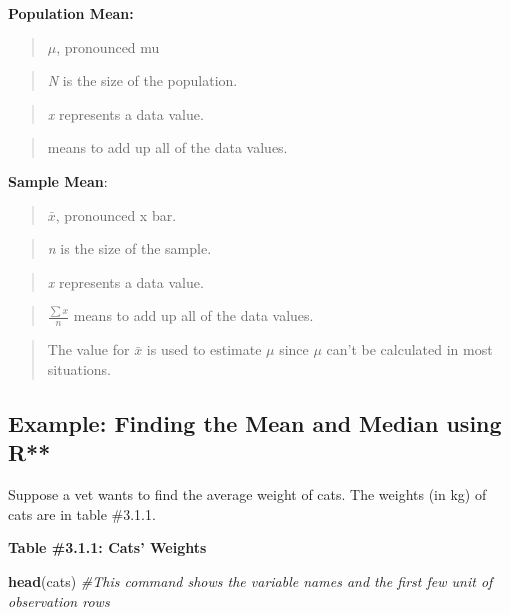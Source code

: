 \documentclass[]{book}
\newenvironment{Shaded}{\begin{snugshade}}{\end{snugshade}}
\newcommand{\CommentTok}[1]{\textcolor[rgb]{0.56,0.35,0.01}{\textit{#1}}}
\newcommand{\KeywordTok}[1]{\textcolor[rgb]{0.13,0.29,0.53}{\textbf{#1}}}
\newcommand{\NormalTok}[1]{#1}
\begin{document}
\textbf{Population Mean:}

\begin{quote}
\(\mu\), pronounced mu
\end{quote}

\begin{quote}
\emph{N} is the size of the population.
\end{quote}

\begin{quote}
\emph{x} represents a data value.
\end{quote}

\begin{quote}
means to add up all of the data values.
\end{quote}

\textbf{Sample Mean}:

\begin{quote}
\(\bar{x}\), pronounced x bar.
\end{quote}

\begin{quote}
\emph{n} is the size of the sample.
\end{quote}

\begin{quote}
\emph{x} represents a data value.
\end{quote}

\begin{quote}
\(\frac{\sum{x} }{n}\) means to add up all of the data values.
\end{quote}

\begin{quote}
The value for \(\bar{x}\) is used to estimate \(\mu\) since \(\mu\) can't be calculated in most
situations.
\end{quote}

\hypertarget{example-finding-the-mean-and-median-using-r}{%
\subsection{Example: Finding the Mean and Median using R**}\label{example-finding-the-mean-and-median-using-r}}

Suppose a vet wants to find the average weight of cats. The weights (in kg) of cats are in table \#3.1.1.

\textbf{Table \#3.1.1: Cats' Weights}

\begin{Shaded}
\begin{Highlighting}[]
\KeywordTok{head}\NormalTok{(cats) }\CommentTok{#This command shows the variable names and the first few unit of observation rows}
\end{Highlighting}
\end{Shaded}
\end{document}
